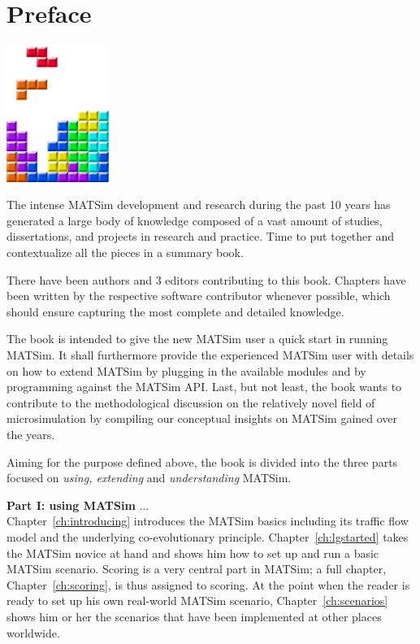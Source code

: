 \chapter*{Preface}

\begin{center} \includegraphics[width=0.25\textwidth, angle=0]{figures/MATSimBook.png} \end{center}

The intense MATSim development and research during the past 10 years has generated a large body of knowledge composed of a vast amount of studies, dissertations, and projects in research and practice. Time to put together and contextualize all the pieces in a summary book.

There have been  authors and 3 editors contributing to this book. Chapters have been written by the respective software contributor whenever possible, which should ensure capturing the most complete and detailed knowledge. 

The book is intended to give the new MATSim user a quick start in running MATSim. It shall furthermore provide the experienced MATSim user with details on how to extend MATSim by plugging in the available modules and by programming against the MATSim API. Last, but not least, the book wants to contribute to the methodological discussion on the relatively novel field of microsimulation by compiling our conceptual insights on MATSim gained over the years.

Aiming for the purpose defined above, the book is divided into the three parts focused on \emph{using, extending} and \emph{understanding} MATSim.

\textbf{Part I: using MATSim} ... \\
Chapter~\ref{ch:introducing} introduces the MATSim basics including its traffic flow model and the underlying co-evolutionary principle. Chapter~\ref{ch:lgstarted} takes the MATSim novice at hand and shows him how to set up and run a basic MATSim scenario. Scoring is a very central part in MATSim; a full chapter, Chapter~\ref{ch:scoring}, is thus assigned to scoring. At the point when the reader is ready to set up his own real-world MATSim scenario, Chapter~\ref{ch:scenarios} shows him or her the scenarios that have been implemented at other places worldwide. 

